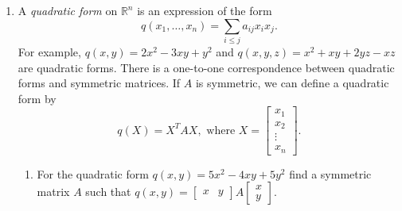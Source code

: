 \documentclass[letterpaper,12pt]{article}
\newcommand{\R}{\mathbb{R}}
\newcommand{\F}{\mathbb{F}}
\begin{document}
\begin{enumerate}
\begin{proof}
\begin{itemize}
 \item Positivity: Let $X\in\F^n$ be a nonzero vector. Then $\langle X,X\rangle = X^\dagger AX>0$, by the definition of a positive-definite matrix.
 \item Definiteness: If $X=0$, then clearly $\langle 0,0\rangle = 0^TA0 = 0$. If $X^\dagger A X=0$ for some $X\in\F^n$, then we must have $X=0$, since otherwise $A$ would not be positive-definite.
 \item Additivity: For any $X,Y,Z\in \F^n$, the properties of matrix multiplication show that
\[
 \langle X+Y,Z\rangle = Z^\dagger A(X+Y) = Z^\dagger AX+Z^\dagger AY = \langle X,Z\rangle + \langle Y,Z\rangle.
\]
 \item Homgeneity: For any $X,Y\in\F^n$ and $\alpha\in\F$, using the properties of matrix multiplication we have
\[
 \langle \alpha X,Y\rangle = Y^\dagger A(\alpha X) = \alpha(Y^\dagger AX) = \alpha\langle X,Y\rangle.
\]
 \item Conjugate symmetry: Since $A$ is symmetric/Hermitian, for any $X,Y\in\F^n$ we have
\[
 \langle Y,X\rangle = X^\dagger (AY) (X^\dagger A)Y = (A\dagger X)^\dagger Y = (AX)^\dagger Y = (Y^\dagger (AX))^\dagger = \langle X,Y\rangle^\dagger = \overline{\langle X,Y\rangle}, 
\]
since if $\lambda$ is a scalar, then $\lambda^\dagger = \overline{\lambda}$.

\end{itemize}
Since all five properties of an inner product are satisfied, we've completed our proof.
\end{proof}

 
 \item A {\em quadratic form} on $\R^n$ is an expression of the form
 \[
 q(x_1,\ldots, x_n) = \sum_{i\leq j}a_{ij}x_ix_j.
 \]
 For example, $q(x,y) = 2x^2-3xy+y^2$ and $q(x,y,z) = x^2+xy+2yz-xz$ are quadratic forms. There is a one-to-one correspondence between quadratic forms and symmetric matrices. If $A$ is symmetric, we can define a quadratic form by
 \[
 q(X) = X^TAX, \text{ where } X = \begin{bmatrix}
 x_1\\x_2\\\vdots\\x_n
 \end{bmatrix}.
 \]
 \begin{enumerate}
 \item For the quadratic form $q(x,y)=5x^2-4xy+5y^2$ find a symmetric matrix $A$ such that $q(x,y)=\begin{bmatrix}x&y\end{bmatrix}A\begin{bmatrix}x\\y\end{bmatrix}$.


\end{enumerate}
\end{enumerate}
\end{document}
